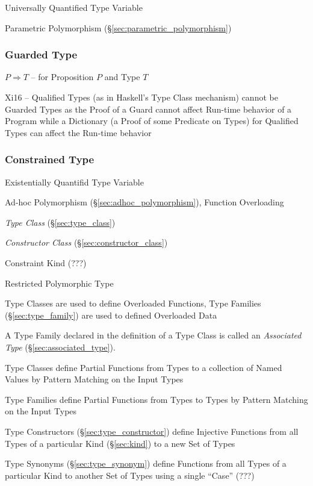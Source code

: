 Universally Quantified Type Variable

Parametric Polymorphism (\S\ref{sec:parametric_polymorphism})



\subsubsection{Guarded Type}\label{sec:guarded_type}

$P \Rightarrow T$ -- for Proposition $P$ and Type $T$

Xi16 -- Qualified Types (as in Haskell's Type Class mechanism) cannot
be Guarded Types as the Proof of a Guard cannot affect Run-time
behavior of a Program while a Dictionary (a Proof of some Predicate on
Types) for Qualified Types can affect the Run-time behavior



\subsubsection{Constrained Type}\label{sec:constrained_type}

Existentially Quantifid Type Variable

Ad-hoc Polymorphism (\S\ref{sec:adhoc_polymorphism}), Function
Overloading

\emph{Type Class} (\S\ref{sec:type_class})

\emph{Constructor Class} (\S\ref{sec:constructor_class})

Constraint Kind (???) %

Restricted Polymorphic Type %

Type Classes are used to define Overloaded Functions, Type Families
(\S\ref{sec:type_family}) are used to defined Overloaded Data

A Type Family declared in the definition of a Type Class is called an
\emph{Associated Type} (\S\ref{sec:associated_type}).

Type Classes define Partial Functions from Types to a collection of
Named Values by Pattern Matching on the Input Types

\fist Type Families define Partial Functions from Types to Types by
Pattern Matching on the Input Types

\fist Type Constructors (\S\ref{sec:type_constructor}) define
Injective Functions from all Types of a particular Kind
(\S\ref{sec:kind}) to a new Set of Types

\fist Type Synonyms (\S\ref{sec:type_synonym}) define Functions from
all Types of a particular Kind to another Set of Types using a single
``Case'' (???) %



